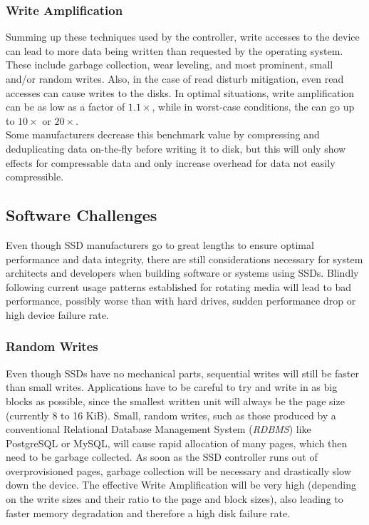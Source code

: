 \documentclass{acm_proc_article-sp}
\begin{document}
\subsubsection*{Write Amplification}
Summing up these techniques used by the controller, write accesses to the device can lead to more data being written than requested by the operating system. These include garbage collection, wear leveling, and most prominent, small and/or random writes.
Also, in the case of read disturb mitigation, even read accesses can cause writes to the disks.
In optimal situations, write amplification can be as low as a factor of $1.1\times$, while in worst-case conditions, the can go up to $10\times$ or $20\times$.
\\
Some manufacturers decrease this benchmark value by compressing and deduplicating data on-the-fly before writing it to disk, but this will only show effects for compressable data and only increase overhead for data not easily compressible.

\subsection{Software Challenges}
Even though SSD manufacturers go to great lengths to ensure optimal performance and data integrity, there are still considerations necessary for system architects and developers when building software or systems using SSDs. Blindly following current usage patterns established for rotating media will lead to bad performance, possibly worse than with hard drives, sudden performance drop or high device failure rate.

\subsubsection*{Random Writes}
Even though SSDs have no mechanical parts, sequential writes will still be faster than small writes. Applications have to be careful to try and write in as big blocks as possible, since the smallest written unit will always be the page size (currently 8 to 16 KiB). Small, random writes, such as those produced by a conventional Relational Database Management System (\emph{RDBMS}) like PostgreSQL or MySQL, will cause rapid allocation of many pages, which then need to be garbage collected. As soon as the SSD controller runs out of overprovisioned pages, garbage collection will be necessary and drastically slow down the device. The effective Write Amplification will be very high (depending on the write sizes and their ratio to the page and block sizes), also leading to faster memory degradation and therefore a high disk failure rate.
\end{document}

